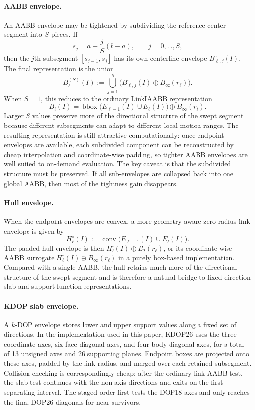 \documentclass[journal]{IEEEtran}
\begin{document}
\paragraph{AABB envelope.}
An AABB envelope may be tightened by subdividing the reference center segment
into $S$ pieces. If
\[
s_j = a + \frac{j}{S}(b-a), \qquad j=0,\dots,S,
\]
then the $j$th subsegment $[s_{j-1},s_j]$ has its own centerline envelope
$B^{\circ}_{\ell,j}(I)$. The final representation is the union
\[
B^{(S)}_\ell(I) := \bigcup_{j=1}^{S}
\bigl(B^{\circ}_{\ell,j}(I) \oplus B_\infty(r_\ell)\bigr).
\]
When $S=1$, this reduces to the ordinary LinkIAABB representation
\[
B_\ell(I) = \operatorname{bbox}\bigl(E_{\ell-1}(I) \cup E_\ell(I)\bigr)
\oplus B_\infty(r_\ell).
\]
Larger $S$ values preserve more of the directional structure of the swept
segment because different subsegments can adapt to different local motion
ranges. The resulting representation is still attractive computationally:
once endpoint envelopes are available, each subdivided component can be
reconstructed by cheap interpolation and coordinate-wise padding, so tighter
AABB envelopes are well suited to on-demand evaluation. The key caveat is that
the subdivided structure must be preserved. If all sub-envelopes are collapsed
back into one global AABB, then most of the tightness gain disappears.


\paragraph{Hull envelope.}
When the endpoint envelopes are convex, a more geometry-aware zero-radius link
envelope is given by
\[
H_\ell^{\circ}(I) := \operatorname{conv}\bigl(E_{\ell-1}(I) \cup E_\ell(I)\bigr).
\]
The padded hull envelope is then $H_\ell^{\circ}(I) \oplus B_2(r_\ell)$, or its
coordinate-wise AABB surrogate
$H_\ell^{\circ}(I) \oplus B_\infty(r_\ell)$ in a purely box-based
implementation. Compared with a single AABB, the hull retains much more of the
directional structure of the swept segment and is therefore a natural bridge to
fixed-direction slab and support-function representations.

\paragraph{KDOP slab envelope.}
A $k$-DOP envelope stores lower and upper support values along a fixed set of
directions. In the implementation used in this paper, KDOP26 uses the three
coordinate axes, six face-diagonal axes, and four body-diagonal axes, for a
total of 13 unsigned axes and 26 supporting planes. Endpoint boxes are projected
onto these axes, padded by the link radius, and merged over each retained
subsegment. Collision checking is correspondingly cheap: after the ordinary
link AABB test, the slab test continues with the non-axis directions and exits
on the first separating interval. The staged order first tests the DOP18 axes
and only reaches the final DOP26 diagonals for near survivors.
\end{document}
